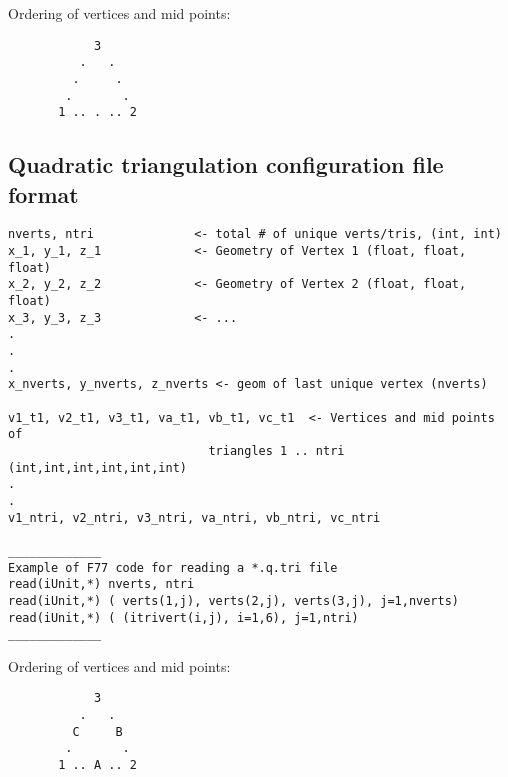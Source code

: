 \documentclass{article}
\begin{document}
Ordering of vertices and mid points:

\begin{verbatim}
            3
          .   . 
         .     .
        .       .
       1 .. . .. 2
\end{verbatim}



\subsection{Quadratic triangulation configuration file format}

\begin{verbatim}
nverts, ntri              <- total # of unique verts/tris, (int, int)
x_1, y_1, z_1             <- Geometry of Vertex 1 (float, float, float)
x_2, y_2, z_2             <- Geometry of Vertex 2 (float, float, float)
x_3, y_3, z_3             <- ...
.
.
.
x_nverts, y_nverts, z_nverts <- geom of last unique vertex (nverts)

v1_t1, v2_t1, v3_t1, va_t1, vb_t1, vc_t1  <- Vertices and mid points of 
                            triangles 1 .. ntri (int,int,int,int,int,int)
.
.
v1_ntri, v2_ntri, v3_ntri, va_ntri, vb_ntri, vc_ntri  

_____________
Example of F77 code for reading a *.q.tri file
read(iUnit,*) nverts, ntri
read(iUnit,*) ( verts(1,j), verts(2,j), verts(3,j), j=1,nverts)
read(iUnit,*) ( (itrivert(i,j), i=1,6), j=1,ntri)
_____________
\end{verbatim}

Ordering of vertices and mid points:

\begin{verbatim}
            3
          .   . 
         C     B
        .       .
       1 .. A .. 2
\end{verbatim}
\end{document}
